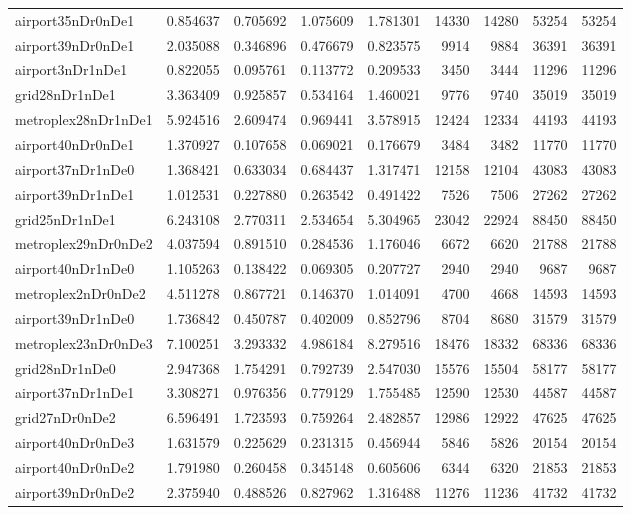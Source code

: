 \begin{longtable}{|l|r|r|r|r|r|r|r|r|}
airport35nDr0nDe1 & 0.854637 & 0.705692 & 1.075609 & 1.781301 & 14330 & 14280 & 53254 & 53254 \\
airport39nDr0nDe1 & 2.035088 & 0.346896 & 0.476679 & 0.823575 & 9914 & 9884 & 36391 & 36391 \\
airport3nDr1nDe1 & 0.822055 & 0.095761 & 0.113772 & 0.209533 & 3450 & 3444 & 11296 & 11296 \\
grid28nDr1nDe1 & 3.363409 & 0.925857 & 0.534164 & 1.460021 & 9776 & 9740 & 35019 & 35019 \\
metroplex28nDr1nDe1 & 5.924516 & 2.609474 & 0.969441 & 3.578915 & 12424 & 12334 & 44193 & 44193 \\
airport40nDr0nDe1 & 1.370927 & 0.107658 & 0.069021 & 0.176679 & 3484 & 3482 & 11770 & 11770 \\
airport37nDr1nDe0 & 1.368421 & 0.633034 & 0.684437 & 1.317471 & 12158 & 12104 & 43083 & 43083 \\
airport39nDr1nDe1 & 1.012531 & 0.227880 & 0.263542 & 0.491422 & 7526 & 7506 & 27262 & 27262 \\
grid25nDr1nDe1 & 6.243108 & 2.770311 & 2.534654 & 5.304965 & 23042 & 22924 & 88450 & 88450 \\
metroplex29nDr0nDe2 & 4.037594 & 0.891510 & 0.284536 & 1.176046 & 6672 & 6620 & 21788 & 21788 \\
airport40nDr1nDe0 & 1.105263 & 0.138422 & 0.069305 & 0.207727 & 2940 & 2940 & 9687 & 9687 \\
metroplex2nDr0nDe2 & 4.511278 & 0.867721 & 0.146370 & 1.014091 & 4700 & 4668 & 14593 & 14593 \\
airport39nDr1nDe0 & 1.736842 & 0.450787 & 0.402009 & 0.852796 & 8704 & 8680 & 31579 & 31579 \\
metroplex23nDr0nDe3 & 7.100251 & 3.293332 & 4.986184 & 8.279516 & 18476 & 18332 & 68336 & 68336 \\
grid28nDr1nDe0 & 2.947368 & 1.754291 & 0.792739 & 2.547030 & 15576 & 15504 & 58177 & 58177 \\
airport37nDr1nDe1 & 3.308271 & 0.976356 & 0.779129 & 1.755485 & 12590 & 12530 & 44587 & 44587 \\
grid27nDr0nDe2 & 6.596491 & 1.723593 & 0.759264 & 2.482857 & 12986 & 12922 & 47625 & 47625 \\
airport40nDr0nDe3 & 1.631579 & 0.225629 & 0.231315 & 0.456944 & 5846 & 5826 & 20154 & 20154 \\
airport40nDr0nDe2 & 1.791980 & 0.260458 & 0.345148 & 0.605606 & 6344 & 6320 & 21853 & 21853 \\
airport39nDr0nDe2 & 2.375940 & 0.488526 & 0.827962 & 1.316488 & 11276 & 11236 & 41732 & 41732 \\

\end{longtable}
